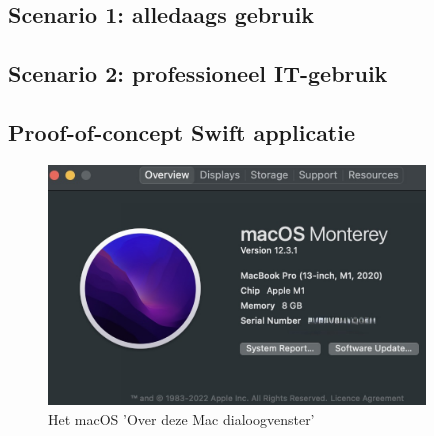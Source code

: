 
\chapter{}
\label{ch:methodologie}

\section{Scenario 1: alledaags gebruik}
\lipsum[1-4]

\section{Scenario 2: professioneel IT-gebruik}
\lipsum[1-4]

\section{Proof-of-concept Swift applicatie}
\begin{figure}[h]
    \centering
    \includegraphics[width=100mm, scale=0.5]{img/overdezemac.jpeg}
    \caption{Het macOS 'Over deze Mac dialoogvenster'}
\end{figure}


